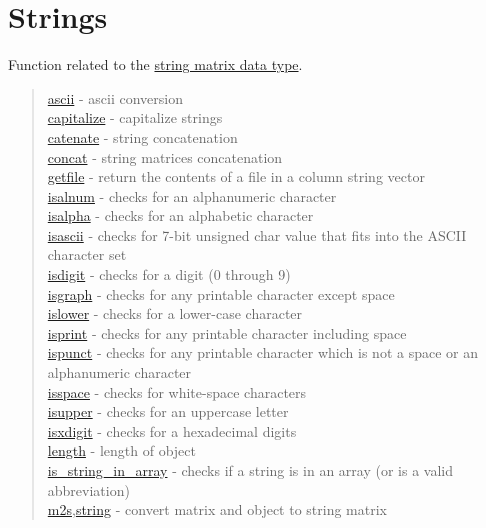 \chapter*{Strings}
\hypertarget{StringsChapter}{}

Function related to the \hyperlink{Smat}{string matrix data type}.

\begin{quote}
\noindent
\hyperlink{ascii}{ascii} - ascii conversion  \\
\hyperlink{capitalize}{capitalize} - capitalize strings\\
\hyperlink{catenate}{catenate} - string concatenation  \\
\hyperlink{concat}{concat} - string matrices concatenation  \\
\hyperlink{getfile}{getfile} - return the contents of a file in a column string vector  \\
\hyperlink{isalnum}{isalnum} - checks for an alphanumeric character\\
\hyperlink{isalpha}{isalpha} - checks for an alphabetic character\\
\hyperlink{isascii}{isascii} - checks for 7-bit unsigned char value that fits into the ASCII character set\\
\hyperlink{isdigit}{isdigit} - checks for a digit (0 through 9)\\
\hyperlink{isgraph}{isgraph} - checks for any printable character except space\\
\hyperlink{islower}{islower} - checks for a lower-case character\\
\hyperlink{isprint}{isprint} - checks for any printable character including space\\
\hyperlink{ispunct}{ispunct} - checks for any printable character which is not a space or an alphanumeric character\\
\hyperlink{isspace}{isspace} - checks for white-space characters\\
\hyperlink{isupper}{isupper} - checks for an uppercase letter\\
\hyperlink{isxdigit}{isxdigit} - checks for a hexadecimal digits\\
\hyperlink{length}{length} - length of object  \\
\hyperlink{is_string_in_array}{is\_string\_in\_array} - checks if a string is in an array (or is a valid abbreviation)\\
\hyperlink{m2s}{m2s},\hyperlink{string}{string} - convert matrix and object to string matrix  \\

\end{quote}
